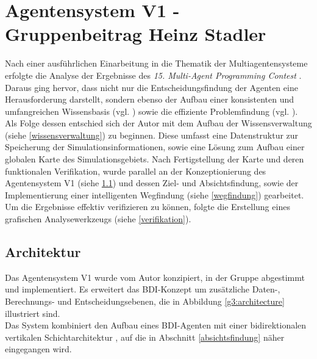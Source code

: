 \documentclass[runningheads]{llncs}
\begin{document}
	
	\section{Agentensystem V1 - Gruppenbeitrag Heinz Stadler}
	Nach einer ausführlichen Einarbeitung in die Thematik der Multiagentensysteme erfolgte die Analyse der Ergebnisse des \textit{15. Multi-Agent Programming Contest} \cite{Ahlbrecht2021}. Daraus ging hervor, dass nicht nur die Entscheidungsfindung der Agenten eine Herausforderung darstellt, sondern ebenso der Aufbau einer konsistenten und umfangreichen Wissensbasis (vgl. \cite[S. 29]{Ahlbrecht2021}) sowie die effiziente Problemfindung (vgl. \cite[S. 17]{Ahlbrecht2021}). \\
	Als Folge dessen entschied sich der Autor mit dem Aufbau der Wissensverwaltung (siehe \ref{wissensverwaltung}) zu beginnen. Diese umfasst eine Datenstruktur zur Speicherung der Simulationsinformationen, sowie eine Lösung zum Aufbau einer globalen Karte des Simulationsgebiets. Nach Fertigstellung der Karte und deren funktionalen Verifikation, wurde parallel an der Konzeptionierung des Agentensystem V1 (siehe \ref{agentV1}) und dessen Ziel- und Absichtsfindung, sowie der Implementierung einer intelligenten Wegfindung (siehe \ref{wegfindung}) gearbeitet. Um die Ergebnisse effektiv verifizieren zu können, folgte die Erstellung eines grafischen Analysewerkzeugs (siehe \ref{verifikation}).
	
	\subsection{Architektur}\label{agentV1}
	Das Agentensystem V1 wurde vom Autor konzipiert, in der Gruppe abgestimmt und implementiert. Es erweitert das BDI-Konzept \cite{Bratman1987} um zusätzliche Daten-, Berechnungs- und Entscheidungsebenen, die in Abbildung \ref{g3:architecture} illustriert sind. \\
	Das System kombiniert den Aufbau eines BDI-Agenten \cite[S. 58]{Weiss2000} mit einer bidirektionalen vertikalen Schichtarchitektur \cite[S. 61-62]{Weiss2000}, auf die in Abschnitt
	\ref{absichtsfindung} näher eingegangen wird.
	
\end{document}
